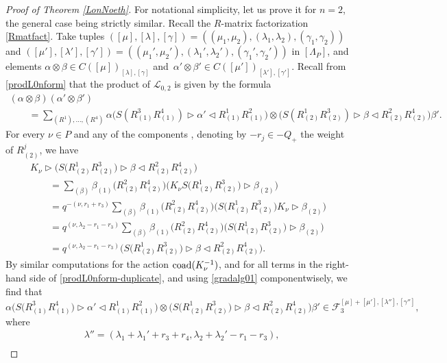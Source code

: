 \documentclass[pdftex]{sigma}
\numberwithin{equation}{section}
\theoremstyle{definition}
\newcommand{\Ff}{{\mathcal F}}
\newcommand{\Ll}{{\mathcal L}}
\begin{document}
\begin{proof}[Proof of Theorem \ref{LonNoeth}]
For notational simplicity, let us prove it for $n=2$, the general case being strictly similar. Recall the $R$-matrix factorization \eqref{Rmatfact}. Take tuples $([\mu],[\lambda],[\gamma]) =((\mu_1,\mu_2),(\lambda_1,\lambda_2),(\gamma_1,\gamma_2))$ and $([\mu'],[\lambda'],[\gamma'])=((\mu_1',\mu_2'),(\lambda_1',\lambda_2'),(\gamma_1',\gamma_2'))$ in $[\Lambda_P]$, and elements $\alpha\otimes \beta \in C([\mu])_{[\lambda],[\gamma]}$ and~${\alpha'\otimes \beta'\in C([\mu'])_{[\lambda'],[\gamma']}}$. Recall from \eqref{prodL0nform} that the product of $\Ll_{0,2}$ is given by the formula
\begin{gather}
(\alpha\otimes \beta) (\alpha' \otimes \beta') \nonumber\\
\qquad= \sum_{(R^1),\dots, (R^4)} \alpha \bigl(S(R^3_{(1)}R^4_{(1)})\rhd \alpha' \lhd R^1_{(1)}R^2_{(1)}\bigr)\otimes \bigl( S(R^1_{(2)}R^3_{(2)}) \rhd \beta \lhd R^2_{(2)}R^4_{(2)}\bigr)\beta'.\label{prodL0nform-duplicate}
\end{gather}
For every $\nu\in P$ and any of the components , denoting by $-r_j\in -Q_+$ the weight of $R^j_{(2)}$, we have
\begin{gather*}
K_\nu \rhd \big( S\big(R^1_{(2)}R^3_{(2)}\big) \rhd \beta \lhd R^2_{(2)}R^4_{(2)}\big) \\
 \qquad= \sum_{(\beta)} \beta_{(1)}\big(R^2_{(2)}R^4_{(2)}\big)\big(K_\nu S\big(R^1_{(2)}R^3_{(2)}\big)\rhd \beta_{(2)}\big)\\
 \qquad= q^{-(\nu,r_1+r_3)}\sum_{(\beta)} \beta_{(1)}\big(R^2_{(2)}R^4_{(2)}\big)\big(S\big(R^1_{(2)}R^3_{(2)}\big)K_\nu \rhd \beta_{(2)}\big)\\
 \qquad= q^{(\nu,\lambda_2-r_1-r_3)}\sum_{(\beta)} \beta_{(1)}\bigl(R^2_{(2)}R^4_{(2)}\bigr)\big(S\big(R^1_{(2)}R^3_{(2)}\big)\rhd \beta_{(2)}\big)\\
 \qquad= q^{(\nu,\lambda_2-r_1-r_3)} \big( S\big(R^1_{(2)}R^3_{(2)}\big) \rhd \beta \lhd R^2_{(2)}R^4_{(2)}\big).
\end{gather*}
By similar computations for the action ${\rm coad}(K_\nu^{-1})$, and for all terms in the right-hand side of \eqref{prodL0nform-duplicate}, and using \eqref{gradalg01} componentwisely, we find that
\[\alpha \big(S\big(R^3_{(1)}R^4_{(1)}\big)\rhd \alpha' \lhd R^1_{(1)}R^2_{(1)}\big)\otimes \big( S\big(R^1_{(2)}R^3_{(2)}\big) \rhd \beta \lhd R^2_{(2)}R^4_{(2)}\big)\beta' \in \Ff_3^{[\mu]+[\mu'], [\lambda''],[\gamma'']},\]
where
\begin{align*}
&\lambda'' = (\lambda_1+\lambda_1'+r_3+r_4,\lambda_2+\lambda_2'-r_1-r_3),\\

\end{align*}
\end{proof}
\end{document}
